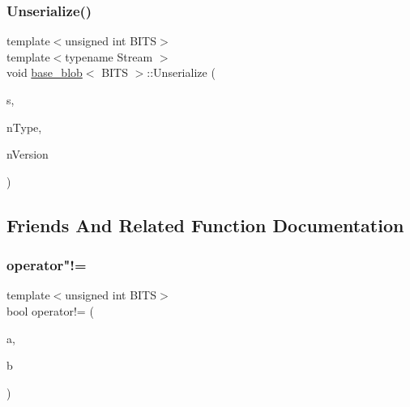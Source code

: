 \mbox{\label{classbase__blob_a3d3f418c65801267e8de23d9367532c0}} 
\subsubsection{\texorpdfstring{Unserialize()}{Unserialize()}}
{\footnotesize\ttfamily template$<$unsigned int B\+I\+TS$>$ \\
template$<$typename Stream $>$ \\
void \mbox{\hyperlink{classbase__blob}{base\+\_\+blob}}$<$ B\+I\+TS $>$\+::Unserialize (\begin{DoxyParamCaption}\item[{Stream \&}]{s,  }\item[{int}]{n\+Type,  }\item[{int}]{n\+Version }\end{DoxyParamCaption})\hspace{0.3cm}{\ttfamily [inline]}}



\subsection{Friends And Related Function Documentation}
\mbox{\label{classbase__blob_a7f04c806d3164a5c0417bcce70be4959}} 
\subsubsection{\texorpdfstring{operator"!=}{operator!=}}
{\footnotesize\ttfamily template$<$unsigned int B\+I\+TS$>$ \\
bool operator!= (\begin{DoxyParamCaption}\item[{const \mbox{\hyperlink{classbase__blob}{base\+\_\+blob}}$<$ B\+I\+TS $>$ \&}]{a,  }\item[{const \mbox{\hyperlink{classbase__blob}{base\+\_\+blob}}$<$ B\+I\+TS $>$ \&}]{b }\end{DoxyParamCaption})\hspace{0.3cm}{\ttfamily [friend]}}

\mbox{\label{classbase__blob_af1ef6aa747985902964e7a5d2f8dad05}} 
